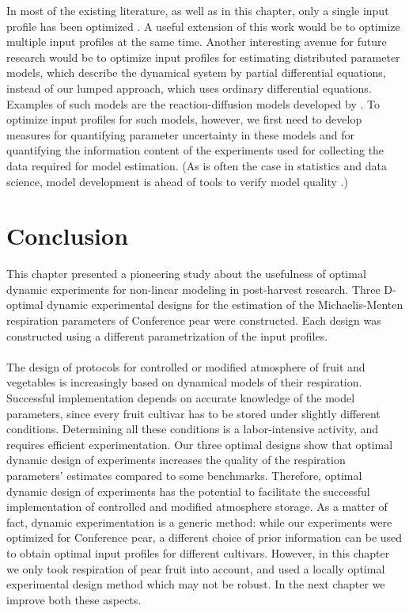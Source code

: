 In most of the existing literature, as well as in this chapter, only a single input profile has been optimized \parencite{bernaerts1,bernaerts2,balsa1,balsa2,nahor1,nahor2}. A useful extension of this work would be to optimize multiple input profiles at the same time. Another interesting avenue for future research would be to optimize input profiles for estimating distributed parameter models, which describe the dynamical system by partial differential equations, instead of our lumped approach, which uses ordinary differential equations. Examples of such models are the reaction-diffusion models developed by \textcite{tri2}. To optimize input profiles for such models, however, we first need to develop measures for quantifying parameter uncertainty in these models and for quantifying the information content of the experiments used for collecting the data required for model estimation. (As is often the case in statistics and data science, model development is ahead of tools to verify model quality \parencite{efronhastie}.)
\section{Conclusion}
This chapter presented a pioneering study about the usefulness of optimal dynamic experiments for non-linear modeling in post-harvest research. Three D-optimal dynamic experimental designs for the estimation of the Michaelis-Menten respiration parameters of Conference pear were constructed. Each design was constructed using a different parametrization of the input profiles.
\\
\\
The design of protocols for controlled or modified atmosphere of fruit and vegetables is increasingly based on dynamical models of their respiration. Successful implementation depends on accurate knowledge of the model parameters, since every fruit cultivar has to be stored under slightly different conditions. Determining all these conditions is a labor-intensive activity, and requires efficient experimentation. Our three optimal designs show that optimal dynamic design of experiments increases the quality of the respiration parameters' estimates compared to some benchmarks. Therefore, optimal dynamic design of experiments has the potential to facilitate the successful implementation of controlled and modified atmosphere storage. As a matter of fact, dynamic experimentation is a generic method: while our experiments were optimized for Conference pear, a different choice of prior information can be used to obtain optimal input profiles for different cultivars. However, in this chapter we only took respiration of pear fruit into account, and used a locally optimal experimental design method which may not be robust. In the next chapter we improve both these aspects.